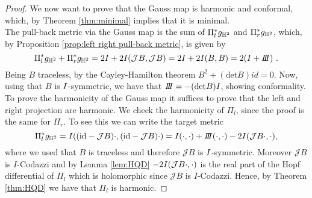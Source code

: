 \begin{proof}
    We now want to prove that the Gauss map is harmonic and conformal, which, by Theorem \ref{thm:minimal} implies that it is minimal.\\
    The pull-back metric via the Gauss map is the sum of $\Pi_l^*g_{\mathbb{H}^2}$ and $\Pi_r^*g_{\mathbb{H}^2}$, which, by Proposition \ref{prop:left right pull-back metric}, is given by
    \[
       \Pi_l^*g_{\H^2} + \Pi_r^*g_{\H^2} = 2I + 2I(\mathcal{J}B,\mathcal{J}B) = 2I + 2I(B,B)= 2(I+ \III) \ .
    \]
    Being $B$ traceless, by the Cayley-Hamilton theorem $B^2 + (\text{det}B)id = 0$. Now, using that $B$ is $I$-symmetric, we have that $\III = -(\text{det}B)I$, showing conformality.\\
    To prove the harmonicity of the Gauss map it suffices to prove that the left and right projection are harmonic. We check the harmonicity of $\Pi_l$, since the proof is the same for $\Pi_r$. To see this we can write the target metric
    \[
        \Pi_l^*g_{\H^2}=I((\text{id}-\mathcal{J}B)\cdot,(\text{id}-\mathcal{J}B)\cdot) = \I(\cdot, \cdot) + \III(\cdot, \cdot) - 2\I(\mathcal{J}B \cdot, \cdot),
    \]
    where we used that $B$ is traceless and therefore $\mathcal{J}B$ is $I$-symmetric. Moreover $\mathcal{J} B$ is $I$-Codazzi and by Lemma \ref{lem:HQD} $- 2I(\mathcal{J}B \cdot, \cdot)$ is the real part of the Hopf differential of $\Pi_l$ which is holomorphic since $\mathcal{J}B$ is $I$-Codazzi. Hence, by Theorem \ref{thm:HQD} we have that $\Pi_l$ is harmonic.
\end{proof}

